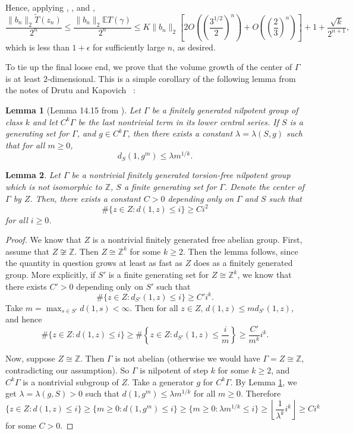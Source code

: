 \documentclass[12pt,reqno]{article}
\makeatletter
\let\reftagform@=\tagform@
\def\tagform@#1{\maketag@@@{(\ignorespaces\textcolor{purple}{#1}\unskip\@@italiccorr)}}
\renewcommand{\eqref}[1]{\textup{\reftagform@{\ref{#1}}}}
\numberwithin{equation}{section}
\newcommand{\E}{\mathbb{E}}
\newcommand{\Z}{\mathbb{Z}}
\newtheorem{lemma}{Lemma}
\makeatother
\begin{document}
Hence, applying \eqref{eqn:pathlengthbound}, \eqref{eqn:suburbbound}, and \eqref{eqn:obstructionbound},
\[ 
   \frac{ \|b_n\|_2 \tilde{T}(z_n)}{2^n} \le \frac{ \| b_n \|_2 \E T(\gamma) }{2^n}
   \le   K \|b_n\|_2 \left[ 2 O \left(\left(\frac{3^{1/2}}{2}\right)^n\right) + O\left(\left(\frac{2}{3}\right)^n\right) \right] + 1 + \frac{\sqrt{k}}{2^{n+1}}, 
\]
which is less than $1 + \epsilon$ for sufficiently large $n$, as desired.

To tie up the final loose end, we prove that the volume growth of the center of $\Gamma$ is at least $2$-dimensional.
This is a simple corollary of the following lemma from the notes of Drutu and Kapovich ~\cite{GGTGrutuKapovich}:
\begin{lemma}[Lemma 14.15 from \cite{GGTGrutuKapovich}] \label{ggtlemma}
   Let $\Gamma$ be a finitely generated nilpotent group of class $k$ and let $C^k \Gamma$ be the last nontrivial term in its lower central series.
   If $S$ is a generating set for $\Gamma$, and $g \in C^k \Gamma$, then there exists a constant $\lambda = \lambda(S,g)$ such that
   for all $m \ge 0$,
   \[
      d_S (1, g^m) \le \lambda m^{1/k}.
   \]
\end{lemma}
\begin{lemma} \label{centergrowth}
   Let $\Gamma$ be a nontrivial finitely generated torsion-free nilpotent group which is not isomorphic to $\Z$, 
   $S$ a finite generating set for $\Gamma$.
   Denote the center of $\Gamma$ by $Z$.
   Then, there exists a constant  $C > 0$ depending only on $\Gamma$ and $S$ such that
   \[
      \# \{z \in Z : d(1,z) \le i\} \ge Ci^2
   \]
   for all $i \ge 0$.
\end{lemma}
\begin{proof}
   We know that $Z$ is a nontrivial finitely generated free abelian group. First, assume that $Z \not\cong \Z$. Then $Z \cong \Z^k$ for some
   $k \ge 2$. Then the lemma follows, since the quantity in question grows at least as fast as $Z$ does as a finitely generated group.
   More explicitly, if $S'$ is a finite generating set for $Z \cong \Z^k$, we know that there exists $C'>0$ depending only on $S'$ such that
   \[
      \# \{z \in Z : d_{S'}(1,z) \le i \} \ge C' i^k.
   \]
   Take $m = \max_{s \in S'} d (1,s) < \infty$. Then for all $z \in Z$, $d(1,z) \le m d_{S'}(1,z)$, and hence
   \[
      \# \{z \in Z : d(1,z) \le i\} \ge \# \left\{z \in Z : d_{S'}(1,z) \le \frac{i}{m} \right\} \ge \frac{C'}{m^k} i^k.
   \]

   Now, suppose $Z \cong \Z$. Then $\Gamma$ is not abelian (otherwise we would have $\Gamma = Z \cong \Z$, contradicting our assumption).
   So $\Gamma$ is nilpotent of step $k$ for some $k \ge 2$, and $C^k \Gamma$ is a nontrivial subgroup of $Z$.
   Take a generator $g$ for $C^k \Gamma$. By Lemma \ref{ggtlemma}, we get
   $\lambda=\lambda(g,S)>0$ such that $d(1, g^m) \le \lambda m^{1/k}$ for all $m \ge 0$. Therefore
   \[
      \{z \in Z : d(1,z) \le i\} \ge \{m \ge 0 : d(1, g^m) \le i\} \ge \{m \ge 0 : \lambda m ^{1/k} \le i\} 
      \ge \left\lfloor \frac{1}{\lambda^k} i^k \right\rfloor \ge C i^k
    \]
    for some $C >0$.
\end{proof}
\end{document}
